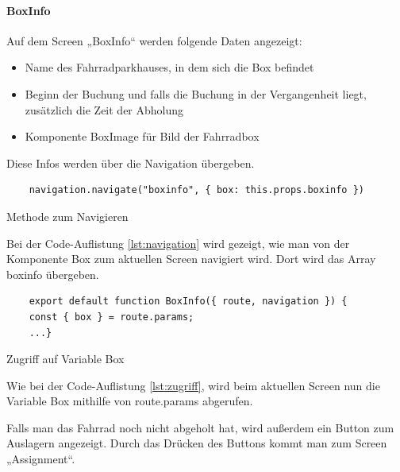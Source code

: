 \bigskip


\paragraph{BoxInfo}
Auf dem Screen „BoxInfo“ werden folgende Daten angezeigt:

\begin{itemize}
  \item Name des Fahrradparkhauses, in dem sich die Box befindet
  \item Beginn der Buchung und falls die Buchung in der Vergangenheit liegt, zusätzlich die Zeit der Abholung
  \item Komponente BoxImage für Bild der Fahrradbox
\end{itemize}

Diese Infos werden über die Navigation übergeben.

\begin{listing}[H]
  \begin{verbatim}
    navigation.navigate("boxinfo", { box: this.props.boxinfo })
\end{verbatim}
  \caption{Methode zum Navigieren}
  \label{lst:navigation}
\end{listing}

Bei der Code-Auflistung \ref*{lst:navigation} wird gezeigt, wie man von der Komponente Box zum aktuellen Screen navigiert wird. Dort wird das \Gls{Array} boxinfo übergeben.

\begin{listing}[H]
  \begin{verbatim}
    export default function BoxInfo({ route, navigation }) {
    const { box } = route.params;
    ...}
\end{verbatim}
  \caption{Zugriff auf Variable Box}
  \label{lst:zugriff}
\end{listing}


Wie bei der Code-Auflistung \ref*{lst:zugriff}, wird beim aktuellen Screen nun die Variable Box mithilfe von route.params abgerufen.

\noindent Falls man das Fahrrad noch nicht abgeholt hat, wird außerdem ein Button zum Auslagern angezeigt. Durch das Drücken des Buttons kommt man zum Screen „Assignment“.

